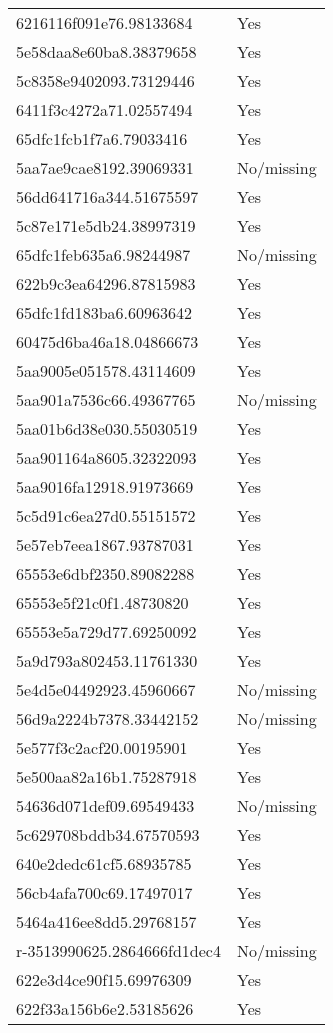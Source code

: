 \begin{tabular}{ll}
6216116f091e76.98133684 & Yes \\
5e58daa8e60ba8.38379658 & Yes \\
5c8358e9402093.73129446 & Yes \\
6411f3c4272a71.02557494 & Yes \\
65dfc1fcb1f7a6.79033416 & Yes \\
5aa7ae9cae8192.39069331 & No/missing \\
56dd641716a344.51675597 & Yes \\
5c87e171e5db24.38997319 & Yes \\
65dfc1feb635a6.98244987 & No/missing \\
622b9c3ea64296.87815983 & Yes \\
65dfc1fd183ba6.60963642 & Yes \\
60475d6ba46a18.04866673 & Yes \\
5aa9005e051578.43114609 & Yes \\
5aa901a7536c66.49367765 & No/missing \\
5aa01b6d38e030.55030519 & Yes \\
5aa901164a8605.32322093 & Yes \\
5aa9016fa12918.91973669 & Yes \\
5c5d91c6ea27d0.55151572 & Yes \\
5e57eb7eea1867.93787031 & Yes \\
65553e6dbf2350.89082288 & Yes \\
65553e5f21c0f1.48730820 & Yes \\
65553e5a729d77.69250092 & Yes \\
5a9d793a802453.11761330 & Yes \\
5e4d5e04492923.45960667 & No/missing \\
56d9a2224b7378.33442152 & No/missing \\
5e577f3c2acf20.00195901 & Yes \\
5e500aa82a16b1.75287918 & Yes \\
54636d071def09.69549433 & No/missing \\
5c629708bddb34.67570593 & Yes \\
640e2dedc61cf5.68935785 & Yes \\
56cb4afa700c69.17497017 & Yes \\
5464a416ee8dd5.29768157 & Yes \\
r-3513990625.2864666fd1dec4 & No/missing \\
622e3d4ce90f15.69976309 & Yes \\
622f33a156b6e2.53185626 & Yes \\

\end{tabular}
